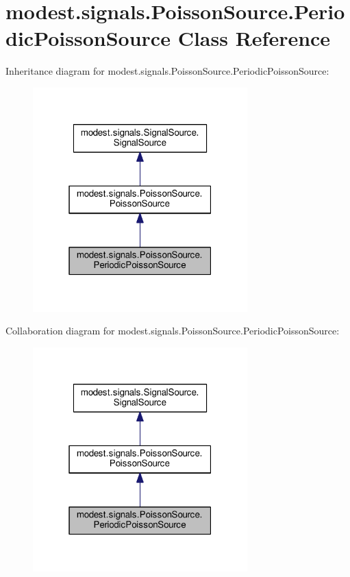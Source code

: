 \hypertarget{classmodest_1_1signals_1_1PoissonSource_1_1PeriodicPoissonSource}{}\section{modest.\+signals.\+Poisson\+Source.\+Periodic\+Poisson\+Source Class Reference}
\label{classmodest_1_1signals_1_1PoissonSource_1_1PeriodicPoissonSource}


Inheritance diagram for modest.\+signals.\+Poisson\+Source.\+Periodic\+Poisson\+Source\+:\nopagebreak
\begin{figure}[H]
\begin{center}
\leavevmode
\includegraphics[width=235pt]{classmodest_1_1signals_1_1PoissonSource_1_1PeriodicPoissonSource__inherit__graph}
\end{center}
\end{figure}


Collaboration diagram for modest.\+signals.\+Poisson\+Source.\+Periodic\+Poisson\+Source\+:\nopagebreak
\begin{figure}[H]
\begin{center}
\leavevmode
\includegraphics[width=235pt]{classmodest_1_1signals_1_1PoissonSource_1_1PeriodicPoissonSource__coll__graph}
\end{center}
\end{figure}
